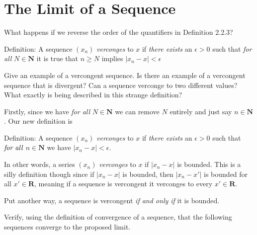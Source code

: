 \section{The Limit of a Sequence}

\begin{exercise}
What happens if we reverse the order of the quantifiers in Definition 2.2.3?

Definition: A sequence $\left(x_{n}\right)$ \emph{verconges} to $x$ if \emph{there exists} an $\epsilon>0$ such that \emph{for all} $N \in \mathbf{N}$ it is true that $n \geq N$ implies $\left|x_{n}-x\right|<\epsilon$

Give an example of a vercongent sequence. Is there an example of a vercongent sequence that is divergent? Can a sequence verconge to two different values? What exactly is being described in this strange definition?
\end{exercise}

\begin{solution}
  Firstly, since we have \emph{for all} $N \in \mathbf{N}$ we can remove $N$ entirely and just say $n \in \mathbf{N}$. Our new definition is

  Definition: A sequence $(x_n)$ \emph{verconges} to $x$ if \emph{there exists} an $\epsilon > 0$ such that $\emph{for all}$ $n \in \mathbf{N}$ we have $|x_n - x| < \epsilon$.

  In other words, a series $(x_n)$ \emph{verconges} to $x$ if $|x_n - x|$ is bounded. This is a silly definition though since if $|x_n - x|$ is bounded, then $|x_n - x'|$ is bounded for all $x' \in \mathbf{R}$, meaning if a sequence is vercongent it verconges to every $x' \in \mathbf{R}$.

  Put another way, a sequence is vercongent \emph{if and only if} it is bounded.
\end{solution}

\begin{exercise}
  Verify, using the definition of convergence of a sequence, that the following sequences converge to the proposed limit.
\end{exercise}


